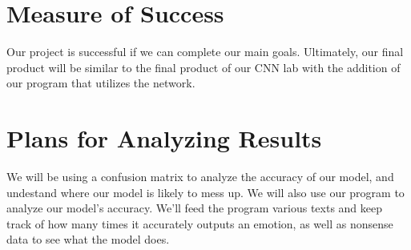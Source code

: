\documentclass[11pt]{article}
\begin{document}
\section{Measure of Success}

Our project is successful if we can complete our main goals. Ultimately,
our final product will be similar to the final product of our CNN lab with
the addition of our program that utilizes the network.


\section{Plans for Analyzing Results}

We will be using a confusion matrix to analyze the accuracy of our model,
and undestand where our model is likely to mess up. We will also use our
program to analyze our model's accuracy. We'll feed the program various
texts and keep track of how many times it accurately outputs an emotion,
as well as nonsense data to see what the model does.
\end{document}
